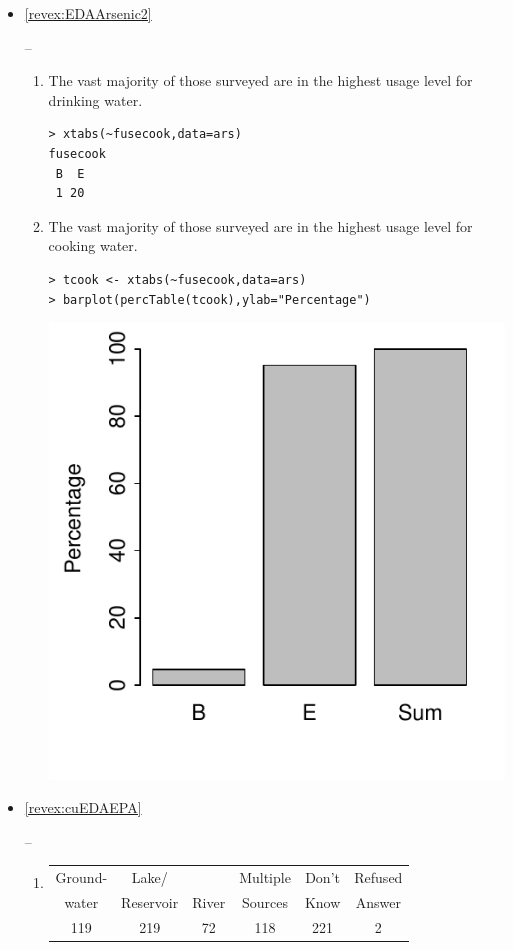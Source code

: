 \documentclass[10pt,openany]{book}\usepackage[]{graphicx}\usepackage[]{color}
\makeatletter
\newenvironment{kframe}{%
 \def\at@end@of@kframe{}%
 \ifinner\ifhmode%
  \def\at@end@of@kframe{\end{minipage}}%
  \begin{minipage}{\columnwidth}%
 \fi\fi%
 \def\FrameCommand##1{\hskip\@totalleftmargin \hskip-\fboxsep
 \colorbox{shadecolor}{##1}\hskip-\fboxsep
     \hskip-\linewidth \hskip-\@totalleftmargin \hskip\columnwidth}%
 \MakeFramed {\advance\hsize-\width
   \@totalleftmargin\z@ \linewidth\hsize
   \@setminipage}}%
 {\par\unskip\endMakeFramed%
 \at@end@of@kframe}
\newenvironment{knitrout}{}{} %
\makeatother
\begin{document}
\begin{itemize}
\begin{enumerate}
\begin{knitrout}
{}



\end{knitrout}
    \end{enumerate}

  \item \hypertarget{ans:EDAArsenic2}{\ref{revex:EDAArsenic2}} --
  \begin{enumerate}
    \item The vast majority of those surveyed are in the highest usage level for drinking water.
\begin{knitrout}
\color{fgcolor}\begin{kframe}
\begin{verbatim}
> xtabs(~fusecook,data=ars)
fusecook
 B  E 
 1 20 
\end{verbatim}
\end{kframe}
\end{knitrout}
    \item The vast majority of those surveyed are in the highest usage level for cooking water.
\begin{knitrout}
\color{fgcolor}\begin{kframe}
\begin{verbatim}
> tcook <- xtabs(~fusecook,data=ars)
> barplot(percTable(tcook),ylab="Percentage")
\end{verbatim}
\end{kframe}

{\centering \includegraphics[width=.4\linewidth]{Figs/ArsBar1-1} 

}



\end{knitrout}
  \end{enumerate}

  \item \hypertarget{ans:cuEDAEPA}{\ref{revex:cuEDAEPA}} --
  \begin{enumerate}
    \item
      \begin{tabular}{c|c|c|c|c|c}
    \hline\hline
    Ground- & Lake/ &  & Multiple & Don't & Refused \\
    water & Reservoir & River & Sources & Know & Answer \\
    \hline
    119 & 219 & 72 & 118 & 221 & 2 \\
    \hline\hline
  \end{tabular}


\end{enumerate}
\end{itemize}
\end{document}

